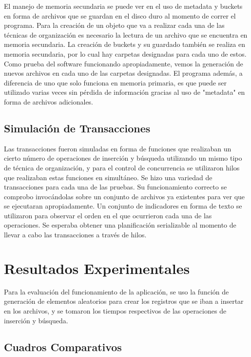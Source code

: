 \documentclass{article}
\begin{document}
      El manejo de memoria secundaria se puede ver en el uso de metadata y buckets en forma de archivos que se guardan en el disco duro al momento de correr el programa. Para la creación de un objeto que va a realizar cada una de las técnicas de organización es necesario la lectura de un archivo que se encuentra en memoria secundaria. La creación de buckets y su guardado también se realiza en memoria secundaria, por lo cual hay carpetas designadas para cada uno de estos. Como prueba del software funcionando apropiadamente, vemos la generación de nuevos archivos en cada uno de las carpetas designadas. El programa además, a diferencia de uno que solo funciona en memoria primaria, es que puede ser utilizado varias veces sin pérdida de información gracias al uso de "metadata" en forma de archivos adicionales.

    \subsection{Simulación de Transacciones}

      Las transacciones fueron simuladas en forma de funciones que realizaban un cierto número de operaciones de inserción y búsqueda utilizando un mismo tipo de técnica de organización, y para el control de concurrencia se utilizaron hilos que realizaban estas funciones en simultáneo. Se hizo una variedad de transacciones para cada una de las pruebas. Su funcionamiento correcto se comprobo invocándolas sobre un conjunto de archivos ya existentes para ver que se ejecutaran apropiadamente. Un conjunto de indicadores en forma de texto se utilizaron para observar el orden en el que ocurrieron cada una de las operaciones. Se esperaba obtener una planificación serializable al momento de llevar a cabo las transacciones a través de hilos.

  \section{Resultados Experimentales}

    Para la evaluación del funcionamiento de la aplicación, se uso la función de generación de elementos aleatorios para crear los registros que se iban a insertar en los archivos, y se tomaron los tiempos respectivos de las operaciones de inserción y búsqueda.

    \subsection{Cuadros Comparativos}
\end{document}
